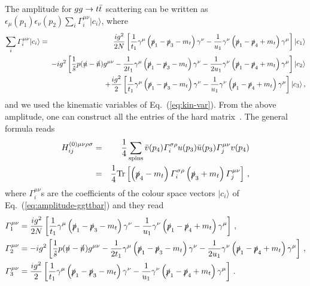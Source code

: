 \documentclass[a4paper,11pt]{report}
\numberwithin{equation}{section}
\newcommand{\slashnbar}{\slashed{\bar n}}
\begin{document}
The amplitude for $gg\to t \bar t$ scattering can be written as 
$\epsilon_\mu(p_1) \epsilon_\nu(p_2) \sum_i \Gamma_i^{\mu\nu} |c_i \rangle$,
where
%
\begin{eqnarray}
  \sum_i \Gamma_i^{\mu\nu} |c_i \rangle 
  & = &
  \frac{ig^2}{2N}
  \left[
  \frac{1}{t_1}\gamma^\mu\left(\slashp_1-\slashp_3-m_t\right)\gamma^\nu -
  \frac{1}{u_1}\gamma^\nu\left(\slashp_1-\slashp_4+m_t\right)\gamma^\mu
  \right]
  | c_1 \rangle
  \nonumber \\
  & &
  \hspace{-5pt}
  -i g^2
  \left[
  \frac{1}{\shat} p (\slashn -\slashnbar) g^{\mu\nu}
  - \frac{1}{2t_1}\gamma^\mu\left(\slashp_1-\slashp_3-m_t\right)\gamma^\nu
  - \frac{1}{2u_1}\gamma^\nu\left(\slashp_1-\slashp_4+m_t\right)\gamma^\mu
  \right]
  | c_2 \rangle
  \nonumber \\
  & &
  \hspace{-8pt} + 
  \frac{ig^2}{2}
  \left[
  \frac{1}{t_1}\gamma^\mu\left(\slashp_1-\slashp_3-m_t\right)\gamma^\nu -
  \frac{1}{u_1}\gamma^\nu\left(\slashp_1-\slashp_4+m_t\right)\gamma^\mu
  \right]
  | c_3 \rangle\,,
  \label{eq:amplitude-ggttbar}
\end{eqnarray}
%
and we used the kinematic variables of Eq.~(\ref{eq:kin-var}).
%
From the above amplitude, one can construct all the entries of the hard
matrix~\cite{AntoniaMTh}. The general formula reads
%
\begin{eqnarray}
  H_{ij}^{(0) \mu\nu\rho\sigma} 
  & = &
  \frac{1}{4}
  \sum_\text{spins}
  {\bar v}(p_4) \Gamma_i^{\sigma\rho}  u(p_3) {\bar u}(p_3) \Gamma_j^{\mu\nu} v(p_4)
  \nonumber \\
  & = &
  \frac{1}{4} \text{Tr} 
  \left[
  \left(\slashed{p}_4-m_t\right) \Gamma_i^{\sigma\rho}
  \left(\slashed{p}_3+m_t\right) \Gamma_j^{\mu\nu}
  \right]\,,
  \label{eq:Hijmatrix-traceform}
\end{eqnarray}
%
where  $\Gamma_i^{\mu\nu}$s are the coefficients of the colour space vectors
$|c_i\rangle$ of Eq.~(\ref{eq:amplitude-ggttbar}) and they read
%
\begin{subequations}
  \begin{align}
    \Gamma_1^{\mu\nu} & =
    \frac{ig^2}{2N}
    \left[
    \frac{1}{t_1}\gamma^\mu\left(\slashp_1-\slashp_3-m_t\right)\gamma^\nu -
    \frac{1}{u_1}\gamma^\nu\left(\slashp_1-\slashp_4+m_t\right)\gamma^\mu
    \right]\,,
    \\
    \Gamma_2^{\mu\nu} & =
    -i g^2
    \left[
    \frac{1}{\shat} p (\slashn -\slashnbar) g^{\mu\nu}
    - \frac{1}{2t_1}\gamma^\mu\left(\slashp_1-\slashp_3-m_t\right)\gamma^\nu
    - \frac{1}{2u_1}\gamma^\nu\left(\slashp_1-\slashp_4+m_t\right)\gamma^\mu
    \right]\,,
    \\
    \Gamma_3^{\mu\nu} & =
    \frac{ig^2}{2}
    \left[
    \frac{1}{t_1}\gamma^\mu\left(\slashp_1-\slashp_3-m_t\right)\gamma^\nu -
    \frac{1}{u_1}\gamma^\nu\left(\slashp_1-\slashp_4+m_t\right)\gamma^\mu
    \right]\,.
  \end{align}
  \label{eq:Gammais}
\end{subequations}
%
\end{document}
